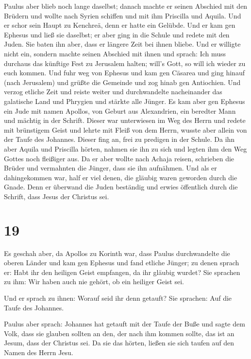  Paulus aber blieb noch lange daselbst; danach machte er
seinen Abschied mit den Brüdern und wollte nach Syrien schiffen und mit
ihm Priscilla und Aquila. Und er schor sein Haupt zu Kenchreä, denn er
hatte ein Gelübde.  Und er kam gen Ephesus und ließ sie
daselbst; er aber ging in die Schule und redete mit den Juden.
 Sie baten ihn aber, dass er längere Zeit bei ihnen
bliebe. Und er willigte nicht ein,  sondern machte seinen
Abschied mit ihnen und sprach: Ich muss durchaus das künftige Fest zu
Jerusalem halten; will's Gott, so will ich wieder zu euch kommen. Und
fuhr weg von Ephesus  und kam gen Cäsarea und ging hinauf
(nach Jerusalem) und grüßte die Gemeinde und zog hinab gen Antiochien.
 Und verzog etliche Zeit und reiste weiter und
durchwandelte nacheinander das galatische Land und Phrygien und stärkte
alle Jünger.  Es kam aber gen Ephesus ein Jude mit namen
Apollos, von Geburt aus Alexandrien, ein beredter Mann und mächtig in
der Schrift.  Dieser war unterwiesen im Weg des Herrn und
redete mit brünstigem Geist und lehrte mit Fleiß von dem Herrn, wusste
aber allein von der Taufe des Johannes.  Dieser fing an,
frei zu predigen in der Schule. Da ihn aber Aquila und Priscilla hörten,
nahmen sie ihn zu sich und legten ihm den Weg Gottes noch fleißiger aus.
 Da er aber wollte nach Achaja reisen, schrieben die
Brüder und vermahnten die Jünger, dass sie ihn aufnähmen. Und als er
dahingekommen war, half er viel denen, die gläubig waren geworden durch
die Gnade.  Denn er überwand die Juden beständig und
erwies öffentlich durch die Schrift, dass Jesus der Christus sei.

\hypertarget{section-18}{%
\section{19}\label{section-18}}

 Es geschah aber, da Apollos zu Korinth war, dass Paulus
durchwandelte die oberen Länder und kam gen Ephesus und fand etliche
Jünger;  zu denen sprach er: Habt ihr den heiligen Geist
empfangen, da ihr gläubig wurdet? Sie sprachen zu ihm: Wir haben auch
nie gehört, ob ein heiliger Geist sei.

 Und er sprach zu ihnen: Worauf seid ihr denn getauft? Sie
sprachen: Auf die Taufe des Johannes.

 Paulus aber sprach: Johannes hat getauft mit der Taufe
der Buße und sagte dem Volk, dass sie glauben sollten an den, der nach
ihm kommen sollte, das ist an Jesum, dass der Christus sei.
 Da sie das hörten, ließen sie sich taufen auf den Namen
des Herrn Jesu.


